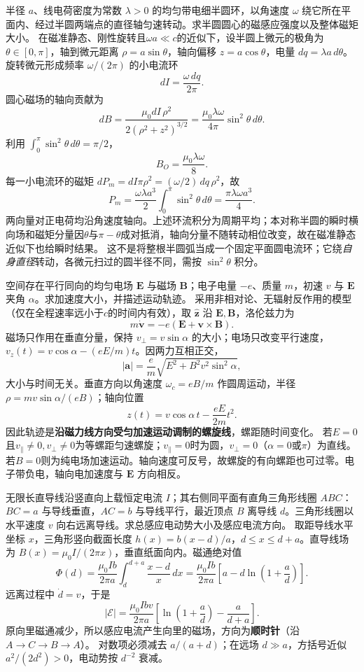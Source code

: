 \problemtext 半径 $a$、线电荷密度为常数 $\lambda>0$ 的均匀带电细半圆环，以角速度 $\omega$ 绕它所在平面内、经过半圆两端点的直径轴匀速转动。求半圆圆心的磁感应强度以及整体磁矩大小。
\workings 在磁准静态、刚性旋转且$\omega a\ll c$的近似下，设半圆上微元的极角为 $\theta\in[0,\pi]$，轴到微元距离 $\rho=a\sin\theta$，轴向偏移 $z=a\cos\theta$，电量 $dq=\lambda a\,d\theta$。旋转微元形成频率 $\omega/(2\pi)$ 的小电流环
\[dI=\frac{\omega\,dq}{2\pi}.\]
圆心磁场的轴向贡献为
\[dB=\frac{\mu_0dI\,\rho^2}{2(\rho^2+z^2)^{3/2}}
=\frac{\mu_0\lambda\omega}{4\pi}\sin^2\theta\,d\theta.\]
利用 $\int_0^\pi\sin^2\theta\,d\theta=\pi/2$，
\[\boxed{B_O=\frac{\mu_0\lambda\omega}{8}}.\]
每一小电流环的磁矩 $dP_m=dI\pi\rho^2=(\omega/2)\,dq\,\rho^2$，故
\[
\boxed{P_m=\frac{\omega\lambda a^3}{2}
\int_0^\pi\sin^2\theta\,d\theta
=\frac{\pi\lambda\omega a^3}{4}}.
\]
两向量对正电荷均沿角速度轴向。上述环流积分为周期平均；本对称半圆的瞬时横向场和磁矩分量因$\theta$与$\pi-\theta$成对抵消，轴向分量不随转动相位改变，故在磁准静态近似下也给瞬时结果。
\crosscheck 这不是将整根半圆弧当成一个固定平面圆电流环；它绕\emph{自身直径}转动，各微元扫过的圆半径不同，需按 $\sin^2\theta$ 积分。

\problemtext 空间存在平行同向的均匀电场 $\bm E$ 与磁场 $\bm B$；电子电量 $-e$、质量 $m$，初速 $v$ 与 $\bm E$ 夹角 $\alpha$。求加速度大小，并描述运动轨迹。
\workings 采用非相对论、无辐射反作用的模型（仅在全程速率远小于$c$的时间内有效），取 $\hat{\bm z}$ 沿 $\bm E,\bm B$，洛伦兹力为
\[m\dot{\bm v}=-e(\bm E+\bm v\times\bm B).\]
磁场只作用在垂直分量，保持 $v_\perp=v\sin\alpha$ 的大小；电场只改变平行速度，$v_z(t)=v\cos\alpha-(eE/m)t$。因两力互相正交，
\[
\boxed{|\bm a|=\frac e m\sqrt{E^2+B^2v^2\sin^2\alpha}},
\]
大小与时间无关。垂直方向以角速度 $\omega_c=eB/m$ 作圆周运动，半径 $\rho=mv\sin\alpha/(eB)$；轴向位置
\[\boxed{z(t)=v\cos\alpha\,t-\frac{eE}{2m}t^2}.\]
因此轨迹是\textbf{沿磁力线方向受匀加速运动调制的螺旋线}，螺距随时间变化。
\crosscheck 若$E=0$且$v_\parallel\ne0,v_\perp\ne0$为等螺距匀速螺旋；$v_\parallel=0$时为圆，$v_\perp=0$（$\alpha=0$或$\pi$）为直线。若$B=0$则为纯电场加速运动。轴向速度可反号，故螺旋的有向螺距也可过零。电子带负电，轴向电加速度与 $\bm E$ 方向相反。

\problemtext 无限长直导线沿竖直向上载恒定电流 $I$；其右侧同平面有直角三角形线圈 $ABC$：$BC=a$ 与导线垂直，$AC=b$ 与导线平行，最近顶点 $B$ 离导线 $d$。三角形线圈以水平速度 $v$ 向右远离导线。求总感应电动势大小及感应电流方向。
\workings 取距导线水平坐标 $x$，三角形竖向截面长度 $h(x)=b(x-d)/a$，$d\le x\le d+a$。直导线场为 $B(x)=\mu_0I/(2\pi x)$，垂直纸面向内。磁通绝对值
\[
\Phi(d)=\frac{\mu_0Ib}{2\pi a}
\int_d^{d+a}\frac{x-d}{x}\,dx
=\frac{\mu_0Ib}{2\pi a}
\left[a-d\ln\left(1+\frac ad\right)\right].
\]
远离过程中 $\dot d=v$，于是
\[
\boxed{|\mathcal E|=
\frac{\mu_0Ibv}{2\pi a}
\left[\ln\left(1+\frac ad\right)-\frac a{d+a}\right]}.
\]
原向里磁通减少，所以感应电流产生向里的磁场，方向为\textbf{顺时针}（沿 $A\to C\to B\to A$）。
\crosscheck 对数项必须减去 $a/(a+d)$；在远场 $d\gg a$，方括号近似 $a^2/(2d^2)>0$，电动势按 $d^{-2}$ 衰减。

